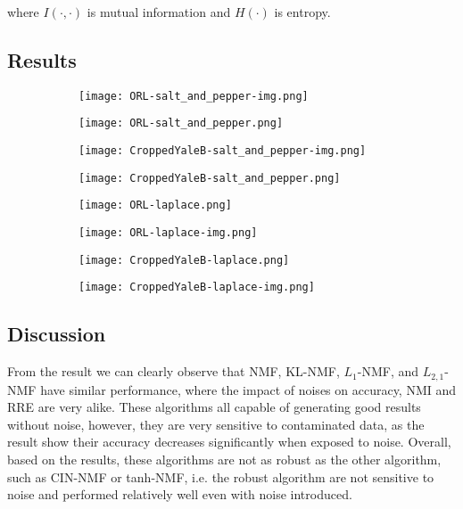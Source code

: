 \documentclass{article} %
\begin{document}
where $I \left ( \cdot , \cdot \right )$ is mutual information and $H \left ( \cdot \right )$ is entropy.

\subsection{Results}
\begin{figure}
\begin{subfigure}{\linewidth}
\texttt{[image: ORL-salt\_and\_pepper-img.png]}
\end{subfigure}
\begin{subfigure}{\linewidth}
\texttt{[image: ORL-salt\_and\_pepper.png]}
\end{subfigure}
\begin{subfigure}{\linewidth}
\texttt{[image: CroppedYaleB-salt\_and\_pepper-img.png]}
\end{subfigure}
\begin{subfigure}{\linewidth}
\texttt{[image: CroppedYaleB-salt\_and\_pepper.png]}
\end{subfigure}
\end{figure}

\begin{figure}
\begin{subfigure}{\linewidth}
\texttt{[image: ORL-laplace.png]}
\end{subfigure}
\begin{subfigure}{\linewidth}
\texttt{[image: ORL-laplace-img.png]}
\end{subfigure}
\begin{subfigure}{\linewidth}
\texttt{[image: CroppedYaleB-laplace.png]}
\end{subfigure}
\begin{subfigure}{\linewidth}
\texttt{[image: CroppedYaleB-laplace-img.png]}
\end{subfigure}
\end{figure}

\subsection{Discussion}
From the result we can clearly observe that NMF, KL-NMF, $L_1$-NMF, and $L_{2,1}$-NMF have similar performance, where the impact of noises on accuracy, NMI and RRE are very alike. These algorithms all capable of generating good results without noise, however, they are very sensitive to contaminated data, as the result show their accuracy decreases significantly when exposed to noise. Overall, based on the results, these algorithms are not as robust as the other algorithm, such as CIN-NMF or tanh-NMF, i.e. the robust algorithm are not sensitive to noise and performed relatively well even with noise introduced.
\end{document}
